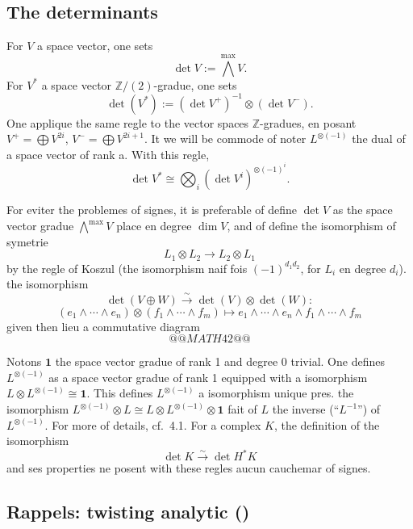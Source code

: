 \documentclass[12pt,a4paper]{article}
\theoremstyle{plain}
\theoremstyle{definition}
\newcommand{\ZZ}{\mathbb{Z}}
\begin{document}
\subsection{The determinants}

For $V$ a space vector, one sets
\[
\det V := \bigwedge^{\max} V .
\]
For $V^*$ a space vector $\ZZ/(2)$-gradue, one sets
\[
\det(V^*) := (\det V^+)^{-1} \otimes (\det V^-) .
\]
One applique the same regle to the vector spaces $\ZZ$-gradues, en posant $V^+ =
\bigoplus V^{2i}$, $V^- = \bigoplus V^{2i+1}$. It we will be commode of noter $L^{\otimes(-1)}$ the dual of a space
vector of rank a. With this regle,
\[
\det V^* \cong \bigotimes_i (\det V^i)^{\otimes (-1)^i} .
\]

For eviter the problemes of signes, it is preferable of define $\det V$
as the space vector gradue $\bigwedge^{\max} V$ place en degree $\dim V$, and of define
the isomorphism of symetrie
\[
L_1 \otimes L_2 \to L_2 \otimes L_1
\]
by the regle of Koszul (the isomorphism naif fois $(-1)^{d_1 d_2}$, for $L_i$ en degree
$d_i$). the isomorphism
\[
\det(V \oplus W) \xrightarrow{\sim} \det(V) \otimes \det(W):
\]
\[
(e_1 \wedge \cdots \wedge e_n) \otimes (f_1 \wedge \cdots \wedge f_m) \mapsto e_1 \wedge \cdots \wedge e_n \wedge f_1 \wedge \cdots \wedge f_m
\]
given then lieu a commutative diagram
\[
@@MATH42@@
\]

Notons $\mathbf{1}$ the space vector gradue of rank 1 and degree 0 trivial. One defines
$L^{\otimes(-1)}$ as a space vector gradue of rank 1 equipped with a isomorphism $L \otimes L^{\otimes(-1)} \cong \mathbf{1}$. This defines $L^{\otimes(-1)}$ a isomorphism unique pres. the isomorphism $L^{\otimes(-1)} \otimes L \cong L \otimes L^{\otimes(-1)} \otimes \mathbf{1}$ fait of $L$ the inverse (``$L^{-1}$'') of $L^{\otimes(-1)}$. For more of details,
cf.~4.1. For a complex $K$, the definition of the isomorphism
\[
\det K \xrightarrow{\sim} \det H^*K
\]
and ses properties ne posent with these regles aucun cauchemar of signes.

\subsection{Rappels: twisting analytic (\cite{14})}
\end{document}
